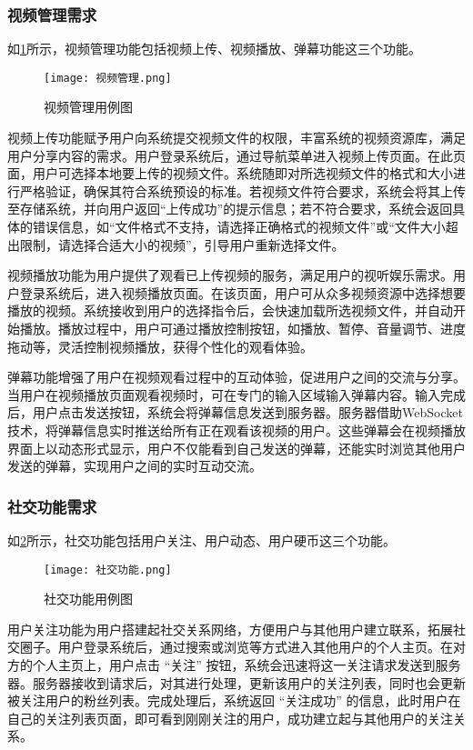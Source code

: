 \subsubsection{视频管理需求}

如\ref{视频管理用例图}所示，视频管理功能包括视频上传、视频播放、弹幕功能这三个功能。
\begin{figure}[hbt]
    \centering
    \texttt{[image: 视频管理.png]}
    \caption{视频管理用例图}
    \label{视频管理用例图}
\end{figure}

视频上传功能赋予用户向系统提交视频文件的权限，丰富系统的视频资源库，满足用户分享内容的需求。用户登录系统后，通过导航菜单进入视频上传页面。在此页面，用户可选择本地要上传的视频文件。系统随即对所选视频文件的格式和大小进行严格验证，确保其符合系统预设的标准。若视频文件符合要求，系统会将其上传至存储系统，并向用户返回“上传成功”的提示信息；若不符合要求，系统会返回具体的错误信息，如“文件格式不支持，请选择正确格式的视频文件”或“文件大小超出限制，请选择合适大小的视频”，引导用户重新选择文件。 

视频播放功能为用户提供了观看已上传视频的服务，满足用户的视听娱乐需求。用户登录系统后，进入视频播放页面。在该页面，用户可从众多视频资源中选择想要播放的视频。系统接收到用户的选择指令后，会快速加载所选视频文件，并自动开始播放。播放过程中，用户可通过播放控制按钮，如播放、暂停、音量调节、进度拖动等，灵活控制视频播放，获得个性化的观看体验。 

弹幕功能增强了用户在视频观看过程中的互动体验，促进用户之间的交流与分享。当用户在视频播放页面观看视频时，可在专门的输入区域输入弹幕内容。输入完成后，用户点击发送按钮，系统会将弹幕信息发送到服务器。服务器借助WebSocket技术，将弹幕信息实时推送给所有正在观看该视频的用户。这些弹幕会在视频播放界面上以动态形式显示，用户不仅能看到自己发送的弹幕，还能实时浏览其他用户发送的弹幕，实现用户之间的实时互动交流。 

\subsubsection{社交功能需求}

如\ref{社交功能用例图}所示，社交功能包括用户关注、用户动态、用户硬币这三个功能。
\begin{figure}[hbt]
    \centering
    \texttt{[image: 社交功能.png]}
    \caption{社交功能用例图}
    \label{社交功能用例图}
\end{figure}

用户关注功能为用户搭建起社交关系网络，方便用户与其他用户建立联系，拓展社交圈子。用户登录系统后，通过搜索或浏览等方式进入其他用户的个人主页。在对方的个人主页上，用户点击 “关注” 按钮，系统会迅速将这一关注请求发送到服务器。服务器接收到请求后，对其进行处理，更新该用户的关注列表，同时也会更新被关注用户的粉丝列表。完成处理后，系统返回 “关注成功” 的信息，此时用户在自己的关注列表页面，即可看到刚刚关注的用户，成功建立起与其他用户的关注关系。

